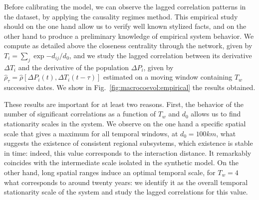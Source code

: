 Before calibrating the model, we can observe the lagged correlation patterns in the dataset, by applying the causality regimes method. This empirical study should on the one hand allow us to verify well known stylized facts, and on the other hand to produce a preliminary knowledge of empirical system behavior. We compute as detailed above the closeness centrality through the network, given by $T_i = \sum_j \exp{-d_{ij}/d_0}$, and we study the lagged correlation between its derivative $\Delta T_i$ and the derivative of the population $\Delta P_i$, given by $\hat{\rho}_{\tau} = \hat{\rho}\left[\Delta P_i(t),\Delta T_i(t-\tau)\right]$ estimated on a moving window containing $T_w$ successive dates. We show in Fig.~\ref{fig:macrocoevol:empirical} the results obtained.


These results are important for at least two reasons. First, the behavior of the number of significant correlations as a function of $T_w$ and $d_0$ allows us to find stationarity scales in the system. We observe on the one hand a specific spatial scale that gives a maximum for all temporal windows, at $d_0 = 100km$, what suggests the existence of consistent regional subsystems, which existence is stable in time: indeed, this value corresponds to the interaction distance. It remarkably coincides with the intermediate scale isolated in the synthetic model. On the other hand, long spatial ranges induce an optimal temporal scale, for $T_w = 4$ what corresponds to around twenty years: we identify it as the overall temporal stationarity scale of the system and study the lagged correlations for this value.



